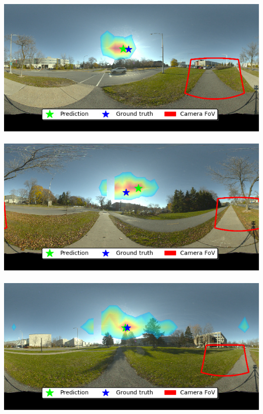 \begin{minipage}{\linewidth}
\begin{multicols}{4}
\includegraphics[width=\mywidth]{AG8A2749_Panorama_hdr-corrected.jpg}\\
\vspace{\panoheight}\\
\includegraphics[width=\mywidth]{AG8A2791_Panorama_hdr-corrected_004.jpg}\\
\vspace{\panoheight}\\
\includegraphics[width=\mywidth]{AG8A2833_Panorama_hdr-corrected.jpg}\\
\vspace{\panoheight}\\

\end{multicols}
\end{minipage}
